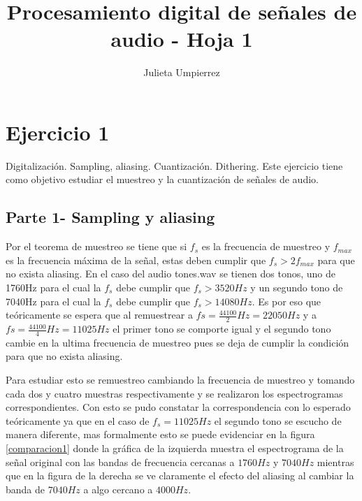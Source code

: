 \documentclass[a4paper]{article}
\title{Procesamiento digital de señales de audio - Hoja 1}
\author{Julieta Umpierrez}
\date{\vspace{-5ex}}
\begin{document}
\maketitle

\section{Ejercicio 1 }

Digitalización. Sampling, aliasing. Cuantización. Dithering.
Este ejercicio tiene como objetivo estudiar el muestreo y la cuantización de señales de audio.

\subsection{Parte 1- Sampling y aliasing}
Por el teorema de muestreo se tiene que si $f_s$ es la frecuencia de muestreo y $f_{max}$ es la frecuencia máxima de la señal, estas deben cumplir que $f_s>2f_{max}$ para que no exista aliasing. 
\newline
En el caso del audio tones.wav se tienen dos tonos, uno de 1760Hz para el cual la $f_s$ debe cumplir que $f_s>3520Hz$ y un segundo tono de 7040Hz para el cual la $f_s$ debe cumplir que $f_s>14080Hz$. Es por eso que teóricamente se espera que al remuestrear a $fs = \frac{44100}{2}Hz = 22050Hz $ y a $fs = \frac{44100}{4}Hz = 11025Hz$ el primer tono se comporte igual y el segundo tono cambie en la ultima frecuencia de muestreo pues se deja de cumplir la condición para que no exista aliasing.

\newline 
Para estudiar esto se remuestreo cambiando la frecuencia de muestreo y tomando cada dos y cuatro muestras respectivamente y se realizaron los espectrogramas correspondientes. Con esto se pudo constatar la correspondencia con lo esperado teóricamente ya que en el caso de $f_s = 11025Hz $ el segundo tono se escucho de manera diferente, mas formalmente esto se puede evidenciar en la figura \ref{comparacion1} donde la gráfica de la izquierda muestra el espectrograma de la señal original con las bandas de frecuencia cercanas a $1760Hz$ y $7040Hz$ mientras que en la figura de la derecha se ve claramente el efecto del aliasing al cambiar la banda de $7040Hz $ a algo cercano a $4000Hz$.
\end{document}
